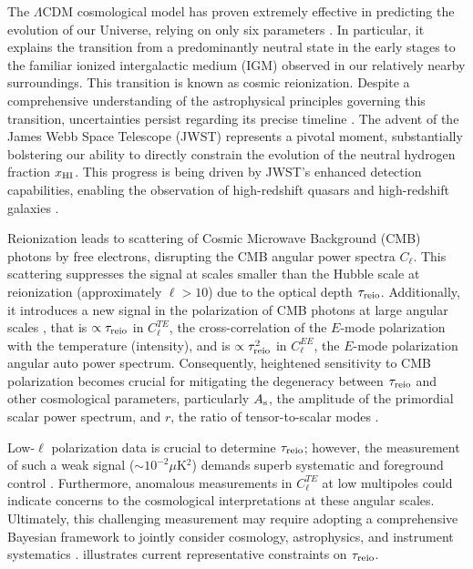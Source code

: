 The $\Lambda$CDM cosmological model has proven extremely effective in
predicting the evolution of our Universe, relying on only six parameters
\cite{Planck2020a}.
In particular, it explains the transition from a predominantly neutral
state in the early stages to the familiar ionized intergalactic medium
(IGM) observed in our relatively nearby surroundings.
This transition is known as cosmic reionization.
Despite a comprehensive understanding of the astrophysical principles
governing this transition, uncertainties persist regarding its precise
timeline \cite{Jin2023}.
The advent of the James Webb Space Telescope (JWST) \cite{Gardner2006}
represents a pivotal moment, substantially bolstering our ability to
directly constrain the evolution of the neutral hydrogen fraction
$x_{\mathrm{HI}}$.
This progress is being driven by JWST's enhanced detection capabilities,
enabling the observation of high-redshift quasars \cite{Eilers2023} and
high-redshift galaxies \cite{Adams2023, Bradley2023, Donnan2023,
Ning2024}.

Reionization leads to scattering of Cosmic Microwave Background (CMB)
photons by free electrons, disrupting the CMB angular power spectra
$C_\ell$.
This scattering suppresses the signal at scales smaller than the Hubble
scale at reionization (approximately $\ell>10$) \cite{Planck2020b} due
to the optical depth $\tau_{\mathrm{reio}}$.
Additionally, it introduces a new signal in the polarization of CMB
photons at large angular scales \cite{Planck2020a}, that is $\propto
\tau_{\mathrm{reio}}$ in $C^{TE}_\ell$, the cross-correlation of the $E$-mode
polarization with the temperature (intensity), and is $\propto
\tau_{\mathrm{reio}}^2$ in $C^{EE}_\ell$, the $E$-mode polarization angular auto
power spectrum.
Consequently, heightened sensitivity to CMB polarization becomes crucial
for mitigating the degeneracy between $\tau_{\mathrm{reio}}$ and other
cosmological parameters, particularly $A_\mathrm{s}$, the amplitude of the
primordial scalar power spectrum, and $r$, the ratio of tensor-to-scalar
modes \cite{Natale2020}.

Low-$\ell$ polarization data is crucial to determine $\tau_{\mathrm{reio}}$;
however, the measurement of such a weak signal ($\sim 10^{-2} \mu$K$^2$)
demands superb systematic and foreground control \cite{Planck2020b}.
Furthermore, anomalous measurements in $C^{TE}_\ell$ at low multipoles
\cite{Planck2020a} could indicate concerns to the cosmological
interpretations at these angular scales.
Ultimately, this challenging measurement may require adopting a
comprehensive Bayesian framework to jointly consider cosmology,
astrophysics, and instrument systematics \cite{Paradiso2023}.
 illustrates current representative constraints on
$\tau_{\mathrm{reio}}$.

